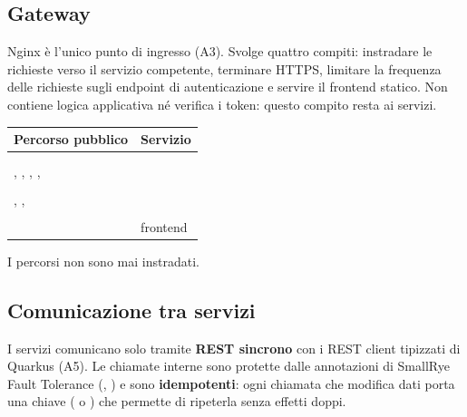 \documentclass[11pt,a4paper]{article}
\begin{document}
\subsection{Gateway}

Nginx è l'unico punto di ingresso (A3). Svolge quattro compiti: instradare le richieste verso il servizio competente, terminare HTTPS, limitare la frequenza delle richieste sugli endpoint di autenticazione e servire il frontend statico. Non contiene logica applicativa né verifica i token: questo compito resta ai servizi.

\begin{tabularx}{\linewidth}{@{}YL{2.6cm}@{}}
  \toprule
  Percorso pubblico & Servizio \\
  \midrule
   &  \\
   &  \\
  , , , ,  &  \\
   &  \\
  , ,  &  \\
   &  \\
  \ep{/} & frontend \\
  \bottomrule
\end{tabularx}

I percorsi  non sono mai instradati.

\subsection{Comunicazione tra servizi}

I servizi comunicano solo tramite \textbf{REST sincrono} con i REST client tipizzati di Quarkus (A5). Le chiamate interne sono protette dalle annotazioni di SmallRye Fault Tolerance (, ) e sono \textbf{idempotenti}: ogni chiamata che modifica dati porta una chiave ( o ) che permette di ripeterla senza effetti doppi.
\end{document}
